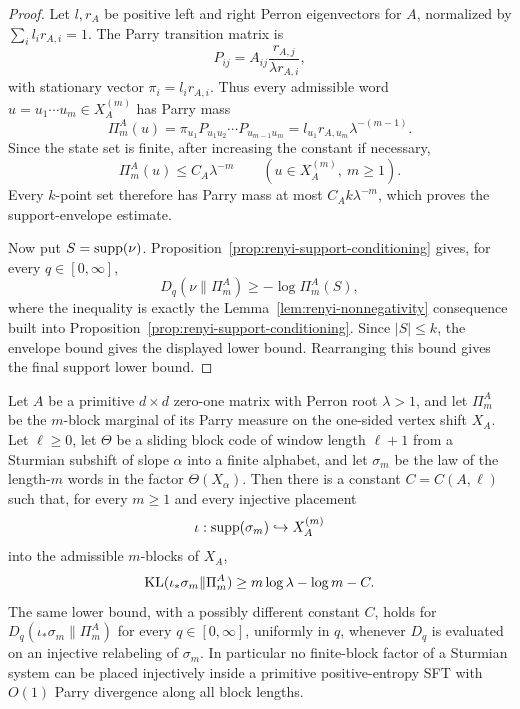 \begin{proof}
Let \(l,r_A\) be positive left and right Perron eigenvectors for \(A\),
normalized by \(\sum_i l_ir_{A,i}=1\).  The Parry transition matrix is
\[
P_{ij}=A_{ij}\frac{r_{A,j}}{\lambda r_{A,i}},
\]
with stationary vector \(\pi_i=l_ir_{A,i}\).  Thus every admissible
word \(u=u_1\cdots u_m\in X_A^{(m)}\) has Parry mass
\[
\Pi_m^A(u)
=
\pi_{u_1}P_{u_1u_2}\cdots P_{u_{m-1}u_m}
=
l_{u_1}r_{A,u_m}\lambda^{-(m-1)}.
\]
Since the state set is finite, after increasing the constant if necessary,
\[
\Pi_m^A(u)\le C_A\lambda^{-m}
\qquad (u\in X_A^{(m)},\ m\ge1).
\]
Every \(k\)-point set therefore has Parry mass at most
\(C_Ak\lambda^{-m}\), which proves the support-envelope estimate.

Now put \(S=\operatorname{supp}(\nu)\).  Proposition~\ref{prop:renyi-support-conditioning}
gives, for every \(q\in[0,\infty]\),
\[
D_q(\nu\|\Pi_m^A)\ge -\log\Pi_m^A(S),
\]
where the inequality is exactly the
Lemma~\ref{lem:renyi-nonnegativity} consequence built into
Proposition~\ref{prop:renyi-support-conditioning}.  Since \(|S|\le k\), the
envelope bound gives the displayed lower bound.  Rearranging this bound gives
the final support lower bound.
\end{proof}

\begin{theorem}
\label{thm:primitive-sft-placement-barrier}
Let \(A\) be a primitive \(d\times d\) zero-one matrix with Perron root
\(\lambda>1\), and let \(\Pi_m^A\) be the \(m\)-block marginal of its Parry
measure on the one-sided vertex shift \(X_A\).  Let \(\ell\ge0\), let
\(\Theta\) be a sliding block code of window length \(\ell+1\) from a
Sturmian subshift of slope \(\alpha\) into a finite alphabet, and let
\(\sigma_m\) be the law of the length-\(m\) words in the factor
\(\Theta(X_\alpha)\).  Then there is a constant \(C=C(A,\ell)\) such that, for every
\(m\ge1\) and every injective placement
\[
\iota:\operatorname{supp}(\sigma_m)\hookrightarrow X_A^{(m)}
\]
into the admissible \(m\)-blocks of \(X_A\),
\[
\operatorname{KL}(\iota_*\sigma_m\|\Pi_m^A)
\ge
m\log\lambda-\log m-C.
\]
The same lower bound, with a possibly different constant \(C\), holds for
\(D_q(\iota_*\sigma_m\|\Pi_m^A)\) for every \(q\in[0,\infty]\), uniformly in
\(q\), whenever \(D_q\) is evaluated on an injective relabeling of
\(\sigma_m\).  In particular no finite-block factor of a Sturmian system can
be placed injectively inside a primitive positive-entropy SFT with \(O(1)\)
Parry divergence along all block lengths.
\end{theorem}

